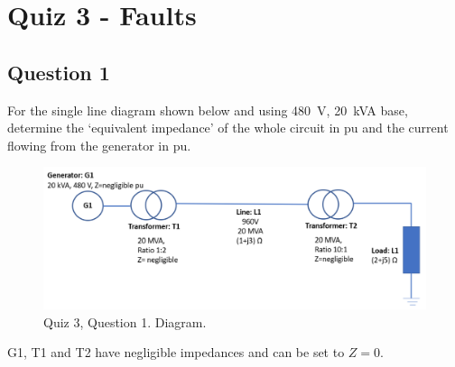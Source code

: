 \chapter{Quiz 3 - Faults}
\section{Question 1}
For the single line diagram shown below and using \SI{480}{\volt}, \SI{20}{kVA} base, determine the `equivalent impedance' of the whole circuit in pu and the current flowing from the generator in pu.
\begin{figure}[H]
    \centering
    \includegraphics[width = \textwidth]{img/figure150.png}
    \caption{Quiz 3, Question 1. Diagram.}
\end{figure}
G1, T1 and T2 have negligible impedances and can be set to $Z = 0$.

